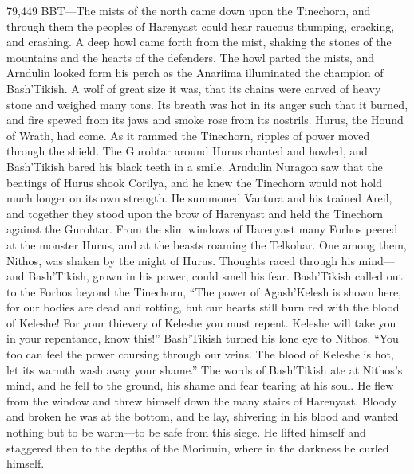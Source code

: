 \documentclass[smalldemyvopaper,11pt,twoside,onecolumn,openright,extrafontsizes]{memoir}
\begin{document}
{{79,449 BBT—The mists of the north came down upon the Tinechorn, and through them the peoples of Harenyast could hear raucous thumping, cracking, and crashing. A deep howl came forth from the mist, shaking the stones of the mountains and the hearts of the defenders. The howl parted the mists, and Arndulin looked form his perch as the Anariima illuminated the champion of Bash’Tikish. A wolf of great size it was, that its chains were carved of heavy stone and weighed many tons. Its breath was hot in its anger such that it burned, and fire spewed from its jaws and smoke rose from its nostrils. Hurus, the Hound of Wrath, had come. As it rammed the Tinechorn, ripples of power moved through the shield. The Gurohtar around Hurus chanted and howled, and Bash’Tikish bared his black teeth in a smile. Arndulin Nuragon saw that the beatings of Hurus shook Corilya, and he knew the Tinechorn would not hold much longer on its own strength. He summoned Vantura and his trained Areil, and together they stood upon the brow of Harenyast and held the Tinechorn against the Gurohtar.
	From the slim windows of Harenyast many Forhos peered at the monster Hurus, and at the beasts roaming the Telkohar. One among them, Nithos, was shaken by the might of Hurus. Thoughts raced through his mind—and Bash’Tikish, grown in his power, could smell his fear. Bash’Tikish called out to the Forhos beyond the Tinechorn, “The power of Agash’Kelesh is shown here, for our bodies are dead and rotting, but our hearts still burn red with the blood of Keleshe! For your thievery of Keleshe you must repent. Keleshe will take you in your repentance, know this!” Bash’Tikish turned his lone eye to Nithos. “You too can feel the power coursing through our veins. The blood of Keleshe is hot, let its warmth wash away your shame.” The words of Bash’Tikish ate at Nithos’s mind, and he fell to the ground, his shame and fear tearing at his soul. He flew from the window and threw himself down the many stairs of Harenyast. Bloody and broken he was at the bottom, and he lay, shivering in his blood and wanted nothing but to be warm—to be safe from this siege. He lifted himself and staggered then to the depths of the Morinuin, where in the darkness he curled himself.

}}
\end{document}
